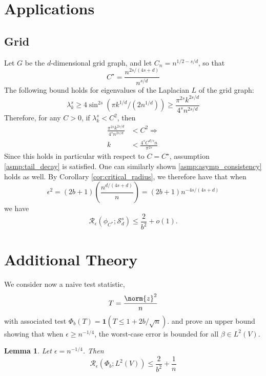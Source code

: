 \documentclass{article}
\newcommand{\1}{\mathbb{I}}
\theoremstyle{alden}
\theoremstyle{aldenthm}
\newtheorem{lemma}{Lemma}
\theoremstyle{definition}
\theoremstyle{remark}
\begin{document}
\section{Applications}

\subsection{Grid}
Let $G$ be the $d$-dimensional grid graph, and let $C_n = n^{1/2 - s/d}$, so that
\begin{equation*}
C^{\star} = \frac{n^{2s/(4s + d)}}{n^{s/d}}
\end{equation*}
The following bound holds for eigenvalues of the Laplacian $L$ of the grid graph:
\begin{equation*}
\lambda_k^s \geq 4\sin^{2s}(\pi k^{1/d}/(2n^{1/d})) \geq \frac{\pi^{2s} k^{2s/d}}{4^{s}n^{2s/d}}
\end{equation*}
Therefore, for any $C > 0$, if $\lambda_k^s < C^2$, then
\begin{align*}
\frac{\pi^{2s} k^{2s/d}}{4^sn^{2s/d}} & < C^2 \Longrightarrow \\
k & < \frac{4^s C^{d/s}n}{\pi^{2s}}
\end{align*}
Since this holds in particular with respect to $C = C^{\star}$, assumption \ref{asmp:tail_decay} is satisfied. One can similarly shown \ref{asmp:asymp_consistency} holds as well. By Corollary \ref{cor:critical_radius}, we therefore have that when
\begin{equation*}
\epsilon^2 = (2b + 1)\left(\frac{n^{d/(4s + d)}}{n}\right) = (2b + 1)n^{-4s/(4s + d)}
\end{equation*}
we have
\begin{equation*}
\mathcal{R}_{\epsilon}(\phi_{C^*};\mathcal{S}_d^s) \leq \frac{2}{b^2} + o(1).
\end{equation*}

\section{Additional Theory}
We consider now a naive test statistic,
\begin{equation*}
T = \frac{\norm{z}^2}{n}
\end{equation*}
with associated test $\Phi_b(T) = \mathbf{1}(T \leq 1 + 2b/\sqrt{n})$.
and prove an upper bound showing that when $\epsilon \geq n^{-1/4}$, the worst-case error is bounded for all $\beta \in L^2(V)$. 

\begin{lemma}
	Let $\epsilon = n^{-1/4}$. Then
	\begin{equation*}
	\mathcal{R}_{\epsilon}(\Phi_b;L^2(V)) \leq \frac{2}{b^2} + \frac{1}{n}
	\end{equation*}
\end{lemma}
\end{document}

